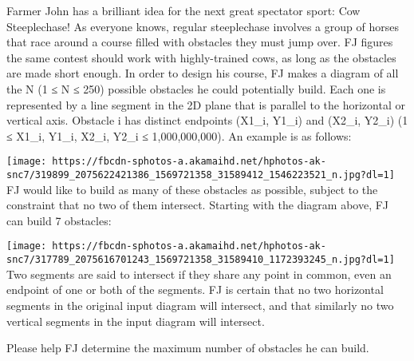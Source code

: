 Farmer John has a brilliant idea for the next great spectator sport: Cow Steeplechase! As everyone knows, regular steeplechase involves a group of horses that race around a course filled with obstacles they must jump over. FJ figures the same contest should work with highly-trained cows, as long as the obstacles are made short enough.  In order to design his course, FJ makes a diagram of all the N (1 ≤ N ≤ 250) possible obstacles he could potentially build. Each one is represented by a line segment in the 2D plane that is parallel to the horizontal or vertical axis. Obstacle i has distinct endpoints (X1\_i, Y1\_i) and (X2\_i, Y2\_i) (1 ≤ X1\_i, Y1\_i, X2\_i, Y2\_i ≤ 1,000,000,000). An example is as follows:   


\texttt{[image: https://fbcdn-sphotos-a.akamaihd.net/hphotos-ak-snc7/319899\_2075622421386\_1569721358\_31589412\_1546223521\_n.jpg?dl=1]}
\\

    FJ would like to build as many of these obstacles as possible, subject to the constraint that no two of them intersect. Starting with the diagram above, FJ can build 7 obstacles:   


\texttt{[image: https://fbcdn-sphotos-a.akamaihd.net/hphotos-ak-snc7/317789\_2075616701243\_1569721358\_31589410\_1172393245\_n.jpg?dl=1]}
\\

    Two segments are said to intersect if they share any point in common, even an endpoint of one or both of the segments.  FJ is certain that no two horizontal segments in the original input diagram will intersect, and that similarly no two vertical segments in the input diagram will intersect.   

    Please help FJ determine the maximum number of obstacles he can build.   

\